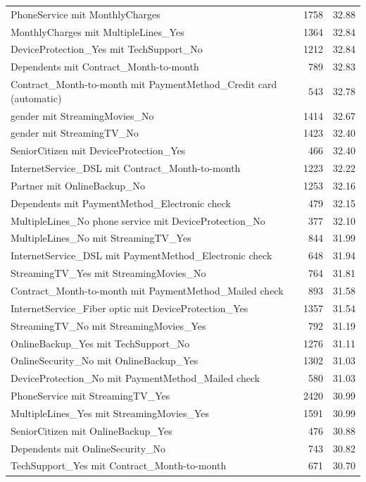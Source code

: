 \documentclass[a4paper,11pt]{article}
\begin{document}
\begin{longtable}{p{9cm}rr}
PhoneService mit MonthlyCharges & 1758 & 32.88 \\
MonthlyCharges mit MultipleLines\_Yes & 1364 & 32.84 \\
DeviceProtection\_Yes mit TechSupport\_No & 1212 & 32.84 \\
Dependents mit Contract\_Month-to-month & 789 & 32.83 \\
Contract\_Month-to-month mit PaymentMethod\_Credit card (automatic) & 543 & 32.78 \\
gender mit StreamingMovies\_No & 1414 & 32.67 \\
gender mit StreamingTV\_No & 1423 & 32.40 \\
SeniorCitizen mit DeviceProtection\_Yes & 466 & 32.40 \\
InternetService\_DSL mit Contract\_Month-to-month & 1223 & 32.22 \\
Partner mit OnlineBackup\_No & 1253 & 32.16 \\
Dependents mit PaymentMethod\_Electronic check & 479 & 32.15 \\
MultipleLines\_No phone service mit DeviceProtection\_No & 377 & 32.10 \\
MultipleLines\_No mit StreamingTV\_Yes & 844 & 31.99 \\
InternetService\_DSL mit PaymentMethod\_Electronic check & 648 & 31.94 \\
StreamingTV\_Yes mit StreamingMovies\_No & 764 & 31.81 \\
Contract\_Month-to-month mit PaymentMethod\_Mailed check & 893 & 31.58 \\
InternetService\_Fiber optic mit DeviceProtection\_Yes & 1357 & 31.54 \\
StreamingTV\_No mit StreamingMovies\_Yes & 792 & 31.19 \\
OnlineBackup\_Yes mit TechSupport\_No & 1276 & 31.11 \\
OnlineSecurity\_No mit OnlineBackup\_Yes & 1302 & 31.03 \\
DeviceProtection\_No mit PaymentMethod\_Mailed check & 580 & 31.03 \\
PhoneService mit StreamingTV\_Yes & 2420 & 30.99 \\
MultipleLines\_Yes mit StreamingMovies\_Yes & 1591 & 30.99 \\
SeniorCitizen mit OnlineBackup\_Yes & 476 & 30.88 \\
Dependents mit OnlineSecurity\_No & 743 & 30.82 \\
TechSupport\_Yes mit Contract\_Month-to-month & 671 & 30.70 \\

\end{longtable}
\end{document}
